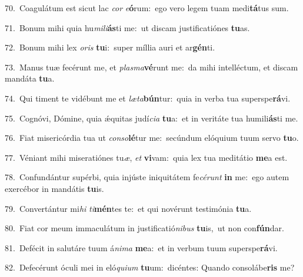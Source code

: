 {\numbfont\textcolor{\numbcolor}{70.}}~Coagulátum est sicut lac \textit{cor} \textit{e}\-\textbf{ó}rum:~\star ego vero legem tuam medi\-\textbf{tá}\-tus sum.\par
{\numbfont\textcolor{\numbcolor}{71.}}~Bonum mihi quia hu\-\textit{mi}\-\textit{li}\textbf{ás}ti me:~\star ut discam justificatiónes \textbf{tu}\-as.\par
{\numbfont\textcolor{\numbcolor}{72.}}~Bonum mihi lex \textit{o}\-\textit{ris} \textbf{tu}\-i:~\star super míllia auri et ar\-\textbf{gén}\-ti.\par
{\numbfont\textcolor{\numbcolor}{73.}}~Manus tuæ fecérunt me, et \textit{plas}\-\textit{ma}\textbf{vé}runt me:~\star da mihi intelléctum, et discam mandáta \textbf{tu}\-a.\par
{\numbfont\textcolor{\numbcolor}{74.}}~Qui timent te vidébunt me et \textit{læ}\-\textit{ta}\textbf{bún}tur:~\star quia in verba tua superspe\-\textbf{rá}\-vi.\par
{\numbfont\textcolor{\numbcolor}{75.}}~Cognóvi, Dómine, quia ǽquitas judí\-\textit{ci}\-\textit{a} \textbf{tu}\-a:~\star et in veritáte tua humili\-\textbf{ás}\-ti me.\par
{\numbfont\textcolor{\numbcolor}{76.}}~Fiat misericórdia tua ut \textit{con}\-\textit{so}\textbf{lé}tur me:~\star secúndum elóquium tuum servo \textbf{tu}\-o.\par
{\numbfont\textcolor{\numbcolor}{77.}}~Véniant mihi miseratiónes tu\-\textit{æ}\-, \textit{et} \textbf{vi}\-vam:~\star quia lex tua meditátio \textbf{me}\-a est.\par
{\numbfont\textcolor{\numbcolor}{78.}}~Confundántur supérbi, quia injúste iniquitátem fe\-\textit{cé}\-\textit{runt} \textbf{in} me:~\star ego autem exercébor in mandátis \textbf{tu}\-is.\par
{\numbfont\textcolor{\numbcolor}{79.}}~Convertántur mi\textit{hi} \textit{ti}\-\textbf{mén}tes te:~\star et qui novérunt testimónia \textbf{tu}\-a.\par
{\numbfont\textcolor{\numbcolor}{80.}}~Fiat cor meum immaculátum in justificatió\-\textit{ni}\-\textit{bus} \textbf{tu}\-is,~\star ut non con\-\textbf{fún}\-dar.\par
{\numbfont\textcolor{\numbcolor}{81.}}~Defécit in salutáre tuum á\-\textit{ni}\-\textit{ma} \textbf{me}\-a:~\star et in verbum tuum superspe\-\textbf{rá}\-vi.\par
{\numbfont\textcolor{\numbcolor}{82.}}~Defecérunt óculi mei in eló\-\textit{qui}\-\textit{um} \textbf{tu}\-um:~\star dicéntes: Quando consolábe\textbf{ris} me?\par
